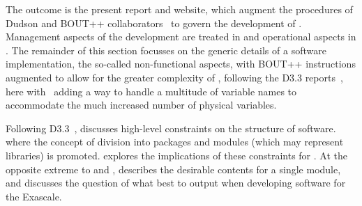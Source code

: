 The outcome is the present report and website, which augment the procedures of
Dudson and BOUT++ collaborators~\cite{y3re314}  to govern the development of \nep.
Management aspects of the development are treated in  and
operational aspects in . The remainder of this section focusses
on the generic details of a software implementation, the so-called
non-functional aspects,  with BOUT++ instructions
augmented to allow for the greater complexity of \nep, following the D3.3
reports~\cite{y2d33}, here with~ adding a way to handle a multitude of variable
names to accommodate the much increased number of physical variables.






Following D3.3~\cite{y2d33},  discusses high-level constraints on the structure of software.
where the concept of division into packages and modules (which may represent libraries)  is promoted.
 explores the implications of these constraints for \nep.
At the opposite extreme to  and ,
 describes the desirable contents for a single module,
and  discusses the question of what best to output when developing 
software for the Exascale.







